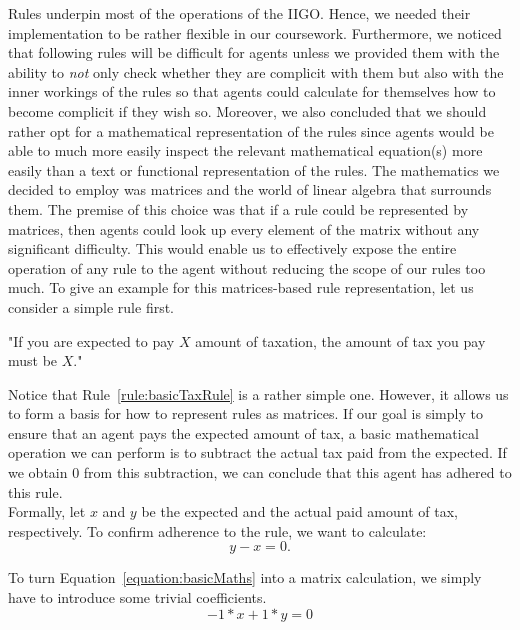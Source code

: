 Rules underpin most of the operations of the IIGO. Hence, we needed their implementation to be rather flexible in our coursework.
Furthermore, we noticed that following rules will be difficult for agents unless we provided them with the ability to \emph{not} only check whether they are complicit with them but also with the inner workings of the rules so that agents could calculate for themselves how to become complicit if they wish so.
Moreover, we also concluded that we should rather opt for a mathematical representation of the rules since agents would be able to much more easily inspect the relevant mathematical equation(s) more easily than a text or functional representation of the rules.
The mathematics we decided to employ was matrices and the world of linear algebra that surrounds them.
\linebreak
The premise of this choice was that if a rule could be represented by matrices, then agents could look up every element of the matrix without any significant difficulty. This would enable us to effectively expose the entire operation of any rule to the agent without reducing the scope of our rules too much.
To give an example for this matrices-based rule representation, let us consider a simple rule first. \\ 
\begin{rule_IIGO}
    "If you are expected to pay $X$ amount of taxation, the amount of tax you pay must be $X$."
\label{rule:basicTaxRule}
\end{rule_IIGO}
\par
Notice that Rule~\ref{rule:basicTaxRule} is a rather simple one. However, it allows us to form a basis for how to represent rules as matrices.
If our goal is simply to ensure that an agent pays the expected amount of tax, a basic mathematical operation we can perform is to subtract the actual tax paid from the expected.
If we obtain $0$ from this subtraction, we can conclude that this agent has adhered to this rule. \\
Formally, let $x$ and $y$ be the expected and the actual paid amount of tax, respectively. To confirm adherence to the rule, we want to calculate:
\begin{equation}
    y - x = 0 . 
    \label{equation:basicMaths}
\end{equation}

To turn Equation~\eqref{equation:basicMaths} into a matrix calculation, we simply have to introduce some trivial coefficients.
\begin{equation}
    -1*x +
       1*y = 0
       \label{equation:coefLinear}
\end{equation}
      
